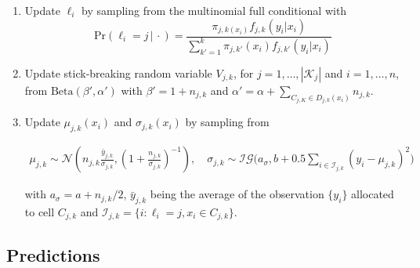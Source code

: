 \documentclass{article} %
\providecommand{\mc}[1]{\mathcal{#1}}
\begin{document}
\begin{enumerate}
\item Update $\ell_i$ by sampling from the multinomial full conditional with 
\[\mbox{Pr}( \ell_i = j\, |\, \cdot) = \frac{ \pi_{j,k(x_i)}f_{j,k}(y_i|x_i) }{ \sum_{k'=1}^k \pi_{j,k'}(x_i)f_{j,k'}(y_i | x_i) } \label{eq:prS}\]

\item Update stick-breaking random variable $V_{j,k}$, for $j=1, \ldots, |\mc{K}_j|$ and $i=1, \ldots, n$, from $\mbox{Beta}(\beta',\alpha')$ with $\beta'=1+n_{j,k}$ and $\alpha'=\alpha+\sum_{C_{j,K} \in D_{j,k}(x_i)} n_{j,k}$.

\item Update $\mu_{j,k}(x_i)$ and $\sigma_{j,k}(x_i)$ by sampling from

\begin{align*}
	\mu_{j,k} \sim \mc{N}\left(n_{j,k}\frac{\bar{y}_{j,k}}{ \sigma_{j,k}} , (1+\frac{n_{j,k}}{\sigma_{j,k}})^{-1}\right), \quad
	 \sigma_{j,k} \sim \mc{IG}\bigg(a_{\sigma},b+0.5\sum_{i \in \mc{I}_{j,k}} \left(y_{i}-\mu_{j,k}\right)^2\bigg)	
\end{align*}

with $a_{\sigma}=a+n_{j,k}/2$, $\bar{y}_{j,k}$ being the average of the observation $\{y_i\}$ allocated to cell $C_{j,k}$ and $\mc{I}_{j,k}=\{i : \ell_i=j, x_i \in C_{j,k}\}$.

\end{enumerate}



\subsection{Predictions}\label{ch3:predictions}
\end{document}
